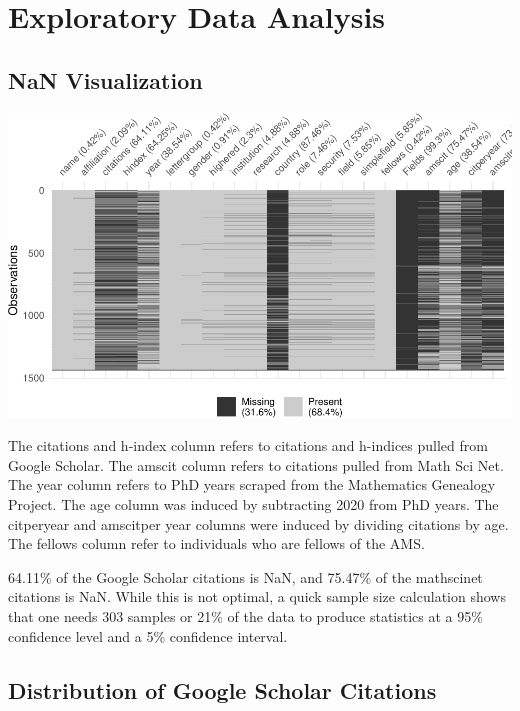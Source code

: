 \documentclass[]{article}
\begin{document}
\hypertarget{exploratory-data-analysis}{%
\section{Exploratory Data Analysis}\label{exploratory-data-analysis}}

\hypertarget{nan-visualization}{%
\subsection{NaN Visualization}\label{nan-visualization}}

\includegraphics{final_files/figure-latex/unnamed-chunk-3-1.pdf}

The citations and h-index column refers to citations and h-indices
pulled from Google Scholar. The amscit column refers to citations pulled
from Math Sci Net. The year column refers to PhD years scraped from the
Mathematics Genealogy Project. The age column was induced by subtracting
2020 from PhD years. The citperyear and amscitper year columns were
induced by dividing citations by age. The fellows column refer to
individuals who are fellows of the AMS.

64.11\% of the Google Scholar citations is NaN, and 75.47\% of the
mathscinet citations is NaN. While this is not optimal, a quick sample
size calculation shows that one needs 303 samples or 21\% of the data to
produce statistics at a 95\% confidence level and a 5\% confidence
interval.

\hypertarget{distribution-of-google-scholar-citations}{%
\subsection{Distribution of Google Scholar
Citations}\label{distribution-of-google-scholar-citations}}
\end{document}
